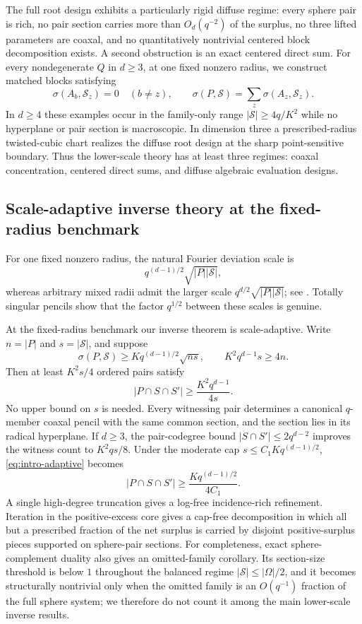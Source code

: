 \documentclass[11pt,letterpaper]{amsart}
\theoremstyle{definition}
\theoremstyle{remark}
\newcommand{\1}{\mathbf 1}
\begin{document}
The full root design exhibits a particularly rigid diffuse regime: every sphere pair is rich, no pair section carries more than $O_d(q^{-2})$ of the surplus, no three lifted parameters are coaxal, and no quantitatively nontrivial centered block decomposition exists.  A second obstruction is an exact centered direct sum.  For every nondegenerate $Q$ in $d\ge3$, at one fixed nonzero radius, we construct matched blocks satisfying
\[
 \sigma(A_b,\mathcal S_z)=0\quad(b\ne z),
 \qquad
 \sigma(P,\mathcal S)=\sum_z\sigma(A_z,\mathcal S_z).
\]
In $d\ge4$ these examples occur in the family-only range $|\mathcal S|\ge4q/K^2$ while no hyperplane or pair section is macroscopic.  In dimension three a prescribed-radius twisted-cubic chart realizes the diffuse root design at the sharp point-sensitive boundary.  Thus the lower-scale theory has at least three regimes: coaxal concentration, centered direct sums, and diffuse algebraic evaluation designs.


\subsection{Scale-adaptive inverse theory at the fixed-radius benchmark}

For one fixed nonzero radius, the natural Fourier deviation scale is
\[
 q^{(d-1)/2}\sqrt{|P||\mathcal S|},
\]
whereas arbitrary mixed radii admit the larger scale $q^{d/2}\sqrt{|P||\mathcal S|}$; see \cite{IR,CILLR,NPV,KP}.  Totally singular pencils show that the factor $q^{1/2}$ between these scales is genuine.

At the fixed-radius benchmark our inverse theorem is scale-adaptive.  Write $n=|P|$ and $s=|\mathcal S|$, and suppose
\begin{equation}\label{eq:intro-fixed}
 \sigma(P,\mathcal S)\ge Kq^{(d-1)/2}\sqrt{ns},
 \qquad
 K^2q^{d-1}s\ge4n.
\end{equation}
Then at least $K^2s/4$ ordered pairs satisfy
\begin{equation}\label{eq:intro-adaptive}
 |P\cap S\cap S'|\ge \frac{K^2q^{d-1}}{4s}.
\end{equation}
No upper bound on $s$ is needed.  Every witnessing pair determines a canonical $q$-member coaxal pencil with the same common section, and the section lies in its radical hyperplane.  If $d\ge3$, the pair-codegree bound $|S\cap S'|\le2q^{d-2}$ improves the witness count to $K^2qs/8$.  Under the moderate cap $s\le C_1Kq^{(d-1)/2}$, \eqref{eq:intro-adaptive} becomes
\[
 |P\cap S\cap S'|\ge \frac{Kq^{(d-1)/2}}{4C_1}.
\]
A single high-degree truncation gives a log-free incidence-rich refinement.  Iteration in the positive-excess core gives a cap-free decomposition in which all but a prescribed fraction of the net surplus is carried by disjoint positive-surplus pieces supported on sphere-pair sections.  For completeness, exact sphere-complement duality also gives an omitted-family corollary.  Its section-size threshold is below $1$ throughout the balanced regime $|\mathcal S|\le|\Omega|/2$, and it becomes structurally nontrivial only when the omitted family is an $O(q^{-1})$ fraction of the full sphere system; we therefore do not count it among the main lower-scale inverse results.
\end{document}
